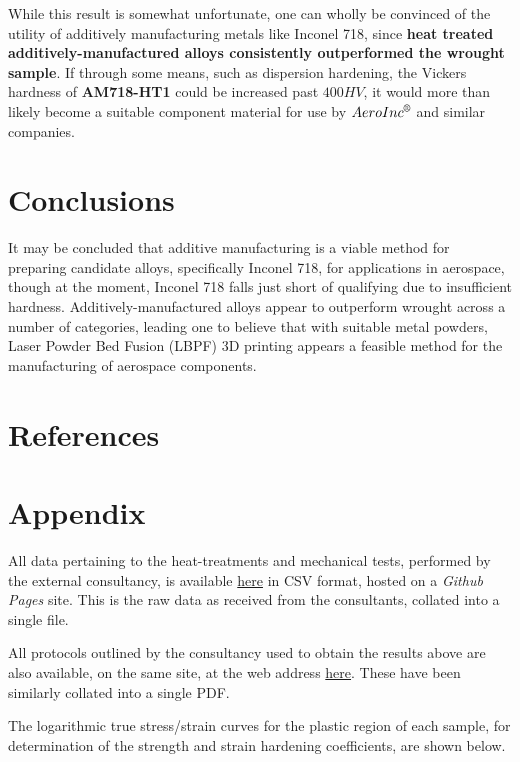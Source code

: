 \documentclass{article}
\begin{document}
While this result is somewhat unfortunate, one can wholly be convinced of the utility of additively manufacturing metals like Inconel 718, since \textbf{heat treated additively-manufactured alloys consistently outperformed the wrought sample}. If through some means, such as dispersion hardening, the Vickers hardness of \textbf{AM718-HT1} could be increased past $400 HV$, it would more than likely become a suitable component material for use by $AeroInc^{\text{\textregistered}}$ and similar companies. 

\section{Conclusions}

It may be concluded that additive manufacturing is a viable method for preparing candidate alloys, specifically Inconel 718, for applications in aerospace, though at the moment, Inconel 718 falls just short of qualifying due to insufficient hardness. Additively-manufactured alloys appear to outperform wrought across a number of categories, leading one to believe that with suitable metal powders, Laser Powder Bed Fusion (LBPF) 3D printing appears a feasible method for the manufacturing of aerospace components.

\section{References}

\printbibliography

\section{Appendix}

All data pertaining to the heat-treatments and mechanical tests, performed by the external consultancy, is available \href{https://spitfyre347.github.io/MEC4135Z_Capstone/Master_Data.csv}{here} in CSV format, hosted on a \textit{Github Pages} site. This is the raw data as received from the consultants, collated into a single file. 

All protocols outlined by the consultancy used to obtain the results above are also available, on the same site, at the web address \href{https://spitfyre347.github.io/MEC4135Z_Capstone/Test_Protocols.pdf}{here}. These have been similarly collated into a single PDF.

The logarithmic true stress/strain curves for the plastic region of each sample, for determination of the strength and strain hardening coefficients, are shown below.
\end{document}

